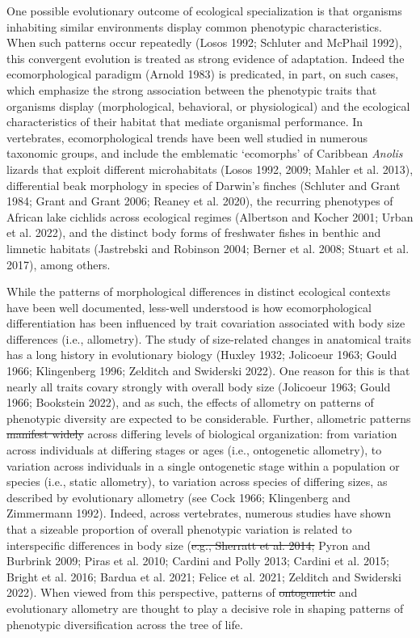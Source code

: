 \documentclass[
  11pt,
]{article}
\providecommand{\DIFaddtex}[1]{{\protect\color{blue}\uwave{#1}}} %
\providecommand{\DIFdeltex}[1]{{\protect\color{red}\sout{#1}}}                      %
\providecommand{\DIFaddbegin}{} %
\providecommand{\DIFaddend}{} %
\providecommand{\DIFdelbegin}{} %
\providecommand{\DIFdelend}{} %
\providecommand{\DIFadd}[1]{\texorpdfstring{\DIFaddtex{#1}}{#1}} %
\providecommand{\DIFdel}[1]{\texorpdfstring{\DIFdeltex{#1}}{}} %
\newcommand{\DIFscaledelfig}{0.5}
\newlength{\DIFdelgraphicswidth} %
\newlength{\DIFdelgraphicsheight} %
\newcommand{\DIFaddincludegraphics}[2][]{{\color{blue}\fbox{\DIFOincludegraphics[#1]{#2}}}} %
\newcommand{\DIFdelincludegraphics}[2][]{%
\sbox{\DIFdelgraphicsbox}{\DIFOincludegraphics[#1]{#2}}%
\settoboxwidth{\DIFdelgraphicswidth}{\DIFdelgraphicsbox} %
\settoboxtotalheight{\DIFdelgraphicsheight}{\DIFdelgraphicsbox} %
\scalebox{\DIFscaledelfig}{%
\parbox[b]{\DIFdelgraphicswidth}{\usebox{\DIFdelgraphicsbox}\\[-\baselineskip] \rule{\DIFdelgraphicswidth}{0em}}\llap{\resizebox{\DIFdelgraphicswidth}{\DIFdelgraphicsheight}{%
\setlength{\unitlength}{\DIFdelgraphicswidth}%
\begin{picture}(1,1)%
\thicklines\linethickness{2pt} %
{\color[rgb]{1,0,0}\put(0,0){\framebox(1,1){}}}%
{\color[rgb]{1,0,0}\put(0,0){\line( 1,1){1}}}%
{\color[rgb]{1,0,0}\put(0,1){\line(1,-1){1}}}%
\end{picture}%
}\hspace*{3pt}}} %
} %
\DeclareRobustCommand{\DIFaddbegin}{\DIFOaddbegin \let\includegraphics\DIFaddincludegraphics} %
\DeclareRobustCommand{\DIFaddend}{\DIFOaddend \let\includegraphics\DIFOincludegraphics} %
\DeclareRobustCommand{\DIFdelbegin}{\DIFOdelbegin \let\includegraphics\DIFdelincludegraphics} %
\DeclareRobustCommand{\DIFdelend}{\DIFOaddend \let\includegraphics\DIFOincludegraphics} %
\begin{document}
One possible evolutionary outcome of ecological specialization is that
organisms inhabiting similar environments display common phenotypic
characteristics. When such patterns occur repeatedly (Losos 1992;
Schluter and McPhail 1992), this convergent evolution is treated as
strong evidence of adaptation. Indeed the ecomorphological paradigm
(Arnold 1983) is predicated, in part, on such cases, which emphasize the
strong association between the phenotypic traits that organisms display
(morphological, behavioral, or physiological) and the ecological
characteristics of their habitat that mediate organismal performance. In
vertebrates, ecomorphological trends have been well studied in numerous
taxonomic groups, and include the emblematic `ecomorphs' of Caribbean
\emph{Anolis} lizards that exploit different microhabitats (Losos 1992,
2009; Mahler et al. 2013), differential beak morphology in species of
Darwin's finches (Schluter and Grant 1984; Grant and Grant 2006; Reaney
et al. 2020), the recurring phenotypes of African lake cichlids across
ecological regimes (Albertson and Kocher 2001; Urban et al. 2022), and
the distinct body forms of freshwater fishes in benthic and limnetic
habitats (Jastrebski and Robinson 2004; Berner et al. 2008; Stuart et
al. 2017), among others. \hfill\break

While the patterns of morphological differences in distinct ecological
contexts have been well documented, less-well understood is how
ecomorphological differentiation has been influenced by trait
covariation associated with body size differences (i.e., allometry). The
study of size-related changes in anatomical traits has a long history in
evolutionary biology (Huxley 1932; Jolicoeur 1963; Gould 1966;
Klingenberg 1996; Zelditch and Swiderski 2022). One reason for this is
that nearly all traits covary strongly with overall body size (Jolicoeur
1963; Gould 1966; Bookstein 2022), and as such, the effects of allometry
on patterns of phenotypic diversity are expected to be considerable.
Further, allometric patterns \DIFdelbegin \DIFdel{manifest widely }\DIFdelend \DIFaddbegin \DIFadd{are widely prominent }\DIFaddend across differing
levels of biological organization: from variation across individuals at
differing stages or ages (i.e., ontogenetic allometry), to variation
across individuals in a single ontogenetic stage within a population or
species (i.e., static allometry), to variation across species of
differing sizes, as described by evolutionary allometry (see Cock 1966;
Klingenberg and Zimmermann 1992). Indeed, across vertebrates, numerous
studies have shown that a sizeable proportion of overall phenotypic
variation is related to interspecific differences in body size (\DIFdelbegin \DIFdel{e.g.,
Sherratt et al. 2014; }\DIFdelend Pyron
and Burbrink 2009; Piras et al. 2010; Cardini and Polly 2013; \DIFaddbegin \DIFadd{e.g.,
Sherratt et al. 2014; }\DIFaddend Cardini et al. 2015; Bright et al. 2016; Bardua et
al. 2021; Felice et al. 2021; Zelditch and Swiderski 2022). When viewed
from this perspective, patterns of \DIFdelbegin \DIFdel{ontogenetic }\DIFdelend \DIFaddbegin \DIFadd{both intraspecific }\DIFaddend and evolutionary
allometry are thought to play a decisive role in shaping patterns of
phenotypic diversification across the tree of life. \hfill\break
\end{document}
